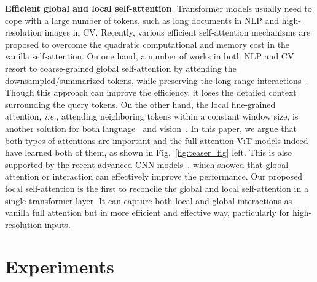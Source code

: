 \documentclass{article}
\begin{document}
\textbf{Efficient global and local self-attention}. 
Transformer models usually need to cope with a large number of tokens, such as long documents in NLP and high-resolution images in CV. Recently, various efficient self-attention mechanisms are proposed to overcome the quadratic computational and memory cost in the vanilla self-attention. On one hand, a number of works in both NLP and CV resort to coarse-grained global self-attention by attending the downsampled/summarized tokens, while preserving the long-range interactions~\cite{rae2019compressive,Pappagari2019, wang2021pyramid,wu2021cvt,han2021transformer}. Though this approach can improve the efficiency, it 
loses the detailed context surrounding the query tokens. On the other hand, the local fine-grained attention, \textit{i.e.}, attending neighboring tokens within a constant window size, is another solution for both language~\cite{beltagy2020longformer,zaheer2020big,ainslie2020etc} and vision~\cite{vaswani2021scaling,liu2021swin,zhang2021multi}. In this paper, we argue that both types of attentions are important and the full-attention ViT models indeed have learned both of them, as shown in Fig.~\ref{fig:teaser_fig} left. This is also supported by the recent advanced CNN models~\cite{hu2018squeeze,woo2018cbam,wang2018non,yang2019cross,bello2019attention,cao2019gcnet,srinivas2021bottleneck}, which showed that global attention or interaction can effectively improve the performance. Our proposed focal self-attention is the first to reconcile the global and local self-attention in a single transformer layer.  It can capture both local and global interactions as vanilla full attention but in more efficient and effective way, particularly for high-resolution inputs.


 \section{Experiments}
\end{document}
